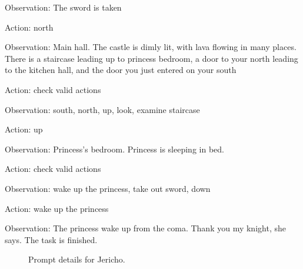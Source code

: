 \begin{tcolorbox}[breakable,title=Prompt Details for Jericho ]
Observation: The sword is taken

Action: north

Observation: Main hall. The castle is dimly lit, with lava flowing in many places. There is a staircase leading up to princess bedroom, a door to your north leading to the kitchen hall, and the door you just entered on your south

Action: check valid actions

Observation: south, north, up, look, examine staircase

Action: up

Observation: Princess’s bedroom. Princess is sleeping in bed. 

Action: check valid actions

Observation: wake up the princess,  take out sword, down

Action: wake up the princess

Observation: The princess wake up from the coma. Thank you my knight, she says. The task is finished.
\end{tcolorbox}
\begin{figure}[!h]
    \vspace{0.01cm}
    \caption{Prompt details for Jericho.}
    \label{fig:jericho_prompt}
\end{figure}